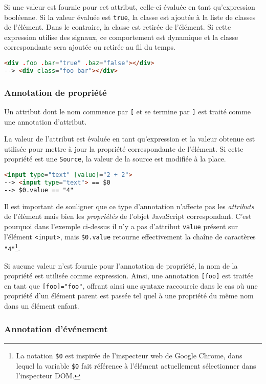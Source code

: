 Si une valeur est fournie pour cet attribut, celle-ci évaluée en tant qu'expression booléenne. Si la valeur évaluée est \texttt{true}, la classe est ajoutée à la liste de classes de l'élément. Dans le contraire, la classe est retirée de l'élément. Si cette expression utilise des signaux, ce comportement est dynamique et la classe correspondante sera ajoutée ou retirée au fil du temps.

\begin{lstlisting}[language=HTML]
<div .foo .bar="true" .baz="false"></div>
--> <div class="foo bar"></div>
\end{lstlisting}

\subsubsection{Annotation de propriété}
Un attribut dont le nom commence par \texttt{[} et se termine par \texttt{]} est traité comme une annotation d'attribut.

La valeur de l'attribut est évaluée en tant qu'expression et la valeur obtenue est utilisée pour mettre à jour la propriété correspondante de l'élément. Si cette propriété est une \texttt{Source}, la valeur de la source est modifiée à la place.

\begin{lstlisting}[language=HTML]
<input type="text" [value]="2 + 2">
--> <input type="text"> == $0
--> $0.value == "4"
\end{lstlisting}

Il est important de souligner que ce type d'annotation n'affecte pas les \emph{attributs} de l'élément mais bien les \emph{propriétés} de l'objet JavaScript correspondant. C'est pourquoi dans l'exemple ci-dessus il n'y a pas d'attribut \texttt{value} présent sur l'élément \texttt{<input>}, mais \texttt{\$0.value} retourne effectivement la chaîne de caractères \texttt{"4"}\footnote{La notation \texttt{\$0} est inspirée de l'inspecteur web de Google Chrome, dans lequel la variable \texttt{\$0} fait référence à l'élément actuellement sélectionner dans l'inspecteur DOM.}.

Si aucune valeur n'est fournie pour l'annotation de propriété, la nom de la propriété est utilisée comme expression. Ainsi, une annotation \texttt{[foo]} est traitée en tant que \texttt{[foo]="foo"}, offrant ainsi une syntaxe raccourcie dans le cas où une propriété d'un élément parent est passée tel quel à une propriété du même nom dans un élément enfant.

\subsubsection{Annotation d'événement}

